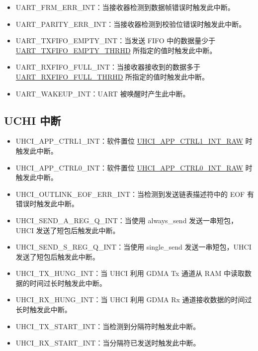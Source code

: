 \documentclass[main\_\_CN.tex]{subfiles}
\begin{document}
\begin{itemize}
\item \label{int:UARTFRMERRINT}UART\_FRM\_ERR\_INT：当接收器检测到数据帧错误时触发此中断。 
\item \label{int:UARTPARITYERRINT}UART\_PARITY\_ERR\_INT：当接收器检测到校验位错误时触发此中断。
\item \label{int:UARTTXFIFOEMPTYINT}UART\_TXFIFO\_EMPTY\_INT：当发送 FIFO 中的数据量少于 \hyperref[fielddesc:UARTTXFIFOEMPTYTHRHD]{UART\_TXFIFO\_EMPTY\_THRHD} 所指定的值时触发此中断。
\item \label{int:UARTRXFIFOFULLINT}UART\_RXFIFO\_FULL\_INT：当接收器接收到的数据多于 \hyperref[fielddesc:UARTRXFIFOFULLTHRHD]{UART\_RXFIFO\_FULL\_THRHD} 所指定的值时触发此中断。
\item \label{int:UARTWAKEUPINT}UART\_WAKEUP\_INT：UART 被唤醒时产生此中断。
\end{itemize}

\subsection{UCHI 中断}
\begin{itemize}
\item \label{int:UHCIAPPCTRL1INT}UHCI\_APP\_CTRL1\_INT：软件置位 \hyperref[fielddesc:UHCIAPPCTRL1INTRAW]{UHCI\_APP\_CTRL1\_INT\_RAW} 时触发此中断。
\item \label{int:UHCIAPPCTRL0INT}UHCI\_APP\_CTRL0\_INT：软件置位 \hyperref[fielddesc:UHCIAPPCTRL0INTRAW]{UHCI\_APP\_CTRL0\_INT\_RAW} 时触发此中断。
\item \label{int:UHCIOUTLINKEOFERRINT}UHCI\_OUTLINK\_EOF\_ERR\_INT：当检测到发送链表描述符中的 EOF 有错误时触发此中断。
\item \label{int:UHCISENDAREGQINT}UHCI\_SEND\_A\_REG\_Q\_INT：当使用 always\_send 发送一串短包，UHCI 发送了短包后触发此中断。
\item \label{int:UHCISENDSREGQINT}UHCI\_SEND\_S\_REG\_Q\_INT：当使用 single\_send 发送一串短包，UHCI 发送了短包后触发此中断。
\item \label{int:UHCITXHUNGINT}UHCI\_TX\_HUNG\_INT：当 UHCI 利用 GDMA Tx 通道从 RAM 中读取数据的时间过长时触发此中断。
\item \label{int:UHCIRXHUNGINT}UHCI\_RX\_HUNG\_INT：当 UHCI 利用 GDMA Rx 通道接收数据的时间过长时触发此中断。
\item \label{int:UHCITXSTARTINT}UHCI\_TX\_START\_INT：当检测到分隔符时触发此中断。
\item \label{int:UHCIRXSTARTINT}UHCI\_RX\_START\_INT：当分隔符已发送时触发此中断。
\end{itemize}
\end{document}
